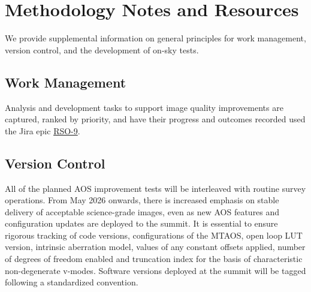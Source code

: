 \documentclass[SO,lsst,authoryear,toc]{lsstdoc}
\begin{document}
\section{Methodology Notes and Resources}
\label{sec:methodology}

We provide supplemental information on general principles for work management, version control, and the development of on-sky tests.

\subsection{Work Management}

Analysis and development tasks to support image quality improvements are captured, ranked by priority, and have their progress and outcomes recorded used the Jira epic \href{https://rubinobs.atlassian.net/browse/RSO-9}{RSO-9}.

\subsection{Version Control}

All of the planned AOS improvement tests will be interleaved with routine survey operations. From May 2026 onwards, there is increased emphasis on stable delivery of acceptable science-grade images, even as new AOS features and configuration updates are deployed to the summit. It is essential to ensure rigorous tracking of code versions, configurations of the MTAOS, open loop LUT version, intrinsic aberration model, values of any constant offsets applied, number of degrees of freedom enabled and truncation index for the basis of characteristic non-degenerate v-modes. Software versions deployed at the summit will be tagged following a standardized convention.
\end{document}
